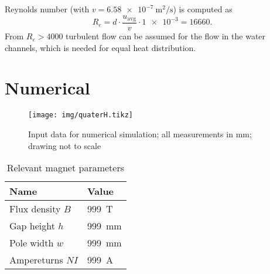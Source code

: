 \documentclass[10pt,a4paper,noendnumber=true]{scrartcl}
\begin{document}
Reynolds number (with $v=\SI{6.58e-7}{\meter\squared\per\second}$) is computed as
\begin{equation}
    R_e = d \cdot \frac{u_\text{avg}}{v} \cdot \num{1e-3} = \num{16660}.
\end{equation}
From $R_e>4000$ turbulent flow can be assumed for the flow in the water channels, which is needed for equal heat distribution.





\newpage
\section{Numerical}

\begin{figure}[H]
\centering
\texttt{[image: img/quaterH.tikz]}
\caption{Input data for numerical simulation; all measurements in \si{\mm}; drawing not to scale}
\end{figure}

\begin{table}[H]
\centering
\caption{Relevant magnet parameters}
\begin{tabular}{ll}
\toprule
Name & Value \\
\midrule
Flux density $B$ & \SI{999}{\tesla}\\
Gap height $h$ & \SI{999}{\mm}\\
Pole width $w$ & \SI{999}{\mm}\\
Ampereturns $NI$ & \SI{999}{\ampere}\\
\bottomrule
\end{tabular}
\end{table}
\end{document}
